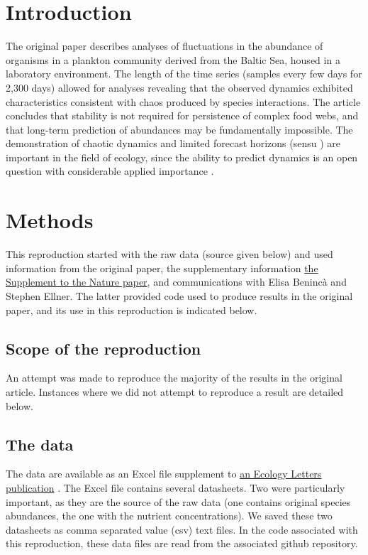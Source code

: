 \documentclass[10pt,a4paper,onecolumn]{article}
\begin{document}
\section{Introduction}\label{introduction}

The original paper describes analyses of fluctuations in the abundance
of organisms in a plankton community derived from the Baltic Sea, housed
in a laboratory environment. The length of the time series (samples
every few days for 2,300 days) allowed for analyses revealing that the
observed dynamics exhibited characteristics consistent with chaos
produced by species interactions. The article concludes that stability
is not required for persistence of complex food webs, and that long-term
prediction of abundances may be fundamentally impossible. The
demonstration of chaotic dynamics and limited forecast horizons (sensu
\textcite{Petchey2015}) are important in the field of ecology, since the
ability to predict dynamics is an open question with considerable
applied importance \textcite{Petchey2015} \textcite{Mouquet2015}.

\section{Methods}\label{methods}

This reproduction started with the raw data (source given below) and
used information from the original paper, the supplementary information
\href{http://www.nature.com/nature/journal/v451/n7180/extref/nature06512-s1.pdf}{the
Supplement to the Nature paper}, and communications with Elisa Benincà
and Stephen Ellner. The latter provided code used to produce results in
the original paper, and its use in this reproduction is indicated below.

\subsection{Scope of the reproduction}\label{scope-of-the-reproduction}

An attempt was made to reproduce the majority of the results in the
original article. Instances where we did not attempt to reproduce a
result are detailed below.

\subsection{The data}\label{the-data}

The data are available as an Excel file supplement to
\href{http://onlinelibrary.wiley.com/doi/10.1111/j.1461-0248.2009.01391.x/abstract}{an
Ecology Letters publication} \textcite{Beninca2009}. The Excel file
contains several datasheets. Two were particularly important, as they
are the source of the raw data (one contains original species
abundances, the one with the nutrient concentrations). We saved these
two datasheets as comma separated value (csv) text files. In the code
associated with this reproduction, these data files are read from the
associated github repository.
\end{document}

